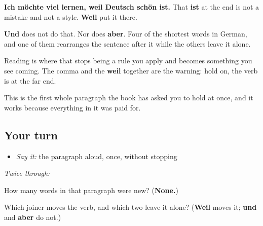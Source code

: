 \begin{grammarlens}[title={Grammar Lens: the word that moves a verb}]
\textbf{Ich möchte viel lernen, weil Deutsch schön ist.} That \textbf{ist} at the end is not a mistake and not a style. \textbf{Weil} put it there.

\textbf{Und} does not do that. Nor does \textbf{aber}. Four of the shortest words in German, and one of them rearranges the sentence after it while the others leave it alone.

Reading is where that stops being a rule you apply and becomes something you see coming. The comma and the \textbf{weil} together are the warning: hold on, the verb is at the far end.

This is the first whole paragraph the book has asked you to hold at once, and it works because everything in it was paid for.
\end{grammarlens}

\subsection*{Your turn}
\begin{itemize}
\raggedright
  \item \emph{Say it:} the paragraph aloud, once, without stopping
\end{itemize}

\emph{Twice through:}

\begin{tcolorbox}[breakable,colback=teal!4,colframe=teal!35!black,title={Before you move on}]
How many words in that paragraph were new? (\textbf{None.})

Which joiner moves the verb, and which two leave it alone? (\textbf{Weil} moves it; \textbf{und} and \textbf{aber} do not.)
\end{tcolorbox}
